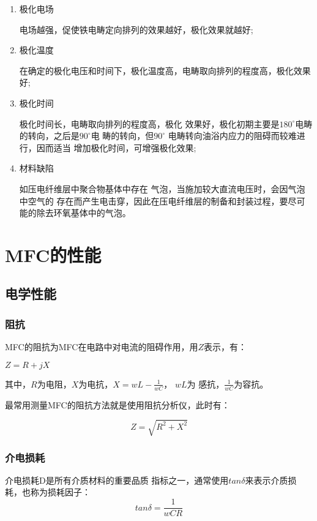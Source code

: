 \documentclass[lang=cn,11pt,a4paper,cite=authoryear]{elegantpaper}
\begin{document}
\begin{enumerate}
  \item 极化电场
  
  电场越强，促使铁电畴定向排列的效果越好，极化效果就越好;

  \item 极化温度
  
  在确定的极化电压和时间下，极化温度高，电畴取向排列的程度高，极化效果好;
  \item 极化时间
  
  极化时间长，电畴取向排列的程度高，极化
  效果好，极化初期主要是$180^{\circ}$电畴的转向，之后是$90^{\circ}$电
  畴的转向，但$90^{\circ}$
  电畴转向油浴内应力的阻碍而较难进行，因而适当
  增加极化时间，可增强极化效果;
  \item 材料缺陷
  
  如压电纤维层中聚合物基体中存在
  气泡，当施加较大直流电压时，会因气泡中空气的
  存在而产生电击穿，因此在压电纤维层的制备和封装过程，要尽可
  能的除去环氧基体中的气泡。
\end{enumerate}

\section{MFC的性能}
\subsection{电学性能}
\subsubsection{阻抗}
MFC的阻抗为MFC在电路中对电流的阻碍作用，用$Z$表示，有：

$Z = R + jX$

其中，$R$为电阻，$X$为电抗，$X = wL - \frac{1}{wC}$， $wL$为
感抗，$\frac{1}{wC}$为容抗。

最常用测量MFC的阻抗方法就是使用阻抗分析仪，此时有：

\begin{equation*}
  Z = \sqrt{R^2 + X^2}
\end{equation*}


\subsubsection{介电损耗}
介电损耗D是所有介质材料的重要品质
指标之一，通常使用$tan\delta$来表示介质损耗，也称为损耗因子：
\begin{equation*}
  tan\delta = \frac{1}{wCR}
\end{equation*}
\end{document}
